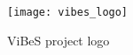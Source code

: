 \begin{figure}[h]
 \centering
 \texttt{[image: vibes\_logo]}
 \caption{ViBeS project logo}
 \label{chap:background:img:vibes_logo}
\end{figure}

%
%
%
%
%
% 

